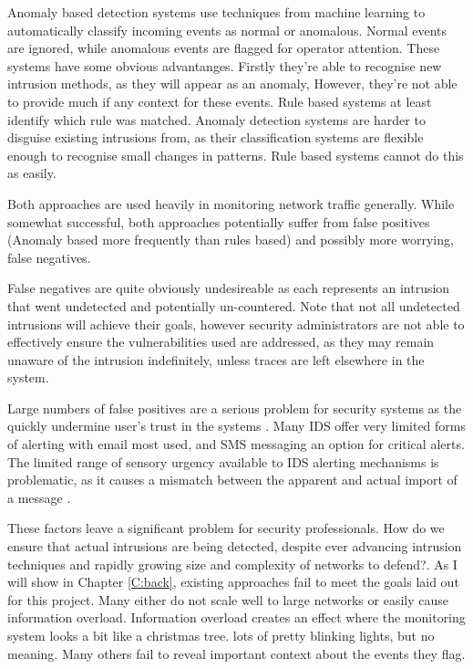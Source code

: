 Anomaly based detection systems use techniques from machine learning to automatically classify incoming events as normal or anomalous. Normal events are ignored, while anomalous events are flagged for operator attention. These systems have some obvious advantanges. Firstly they're able to recognise new intrusion methods, as they will appear as an anomaly, However, they're not able to provide much if any context for these events. Rule based systems at least identify which rule was matched. Anomaly detection systems are harder to disguise existing intrusions from, as their classification systems are flexible enough to recognise small changes in patterns. Rule based systems cannot do this as easily.

Both approaches are used heavily in monitoring network traffic generally. While somewhat successful, both approaches potentially suffer from false positives (Anomaly based more frequently than rules based) and possibly more worrying, false negatives. 

False negatives are quite obviously undesireable as each represents an intrusion that went undetected and potentially un-countered. Note that not all undetected intrusions will achieve their goals, however security administrators are not able to effectively ensure the vulnerabilities used are addressed, as they may remain unaware of the intrusion indefinitely, unless traces are left elsewhere in the system.

Large numbers of false positives are a serious problem for security systems as the quickly undermine user's trust in the systems \cite{stanton1994human}. Many IDS offer very limited forms of alerting with email most used, and SMS messaging an option for critical alerts. The limited range of sensory urgency available to IDS alerting mechanisms is problematic, as it causes a mismatch between the apparent and actual import of a message \cite{stanton1994human}. 

These factors leave a significant problem for security professionals. How do we ensure that actual intrusions are being detected, despite ever advancing intrusion techniques and rapidly growing size and complexity of networks to defend?. As I will show in Chapter \ref{C:back}, existing approaches fail to meet the goals laid out for this project. Many either do not scale well to large networks or easily cause information overload. Information overload creates an effect where the monitoring system looks a bit like a christmas tree. lots of pretty blinking lights, but no meaning. Many others fail to reveal important context about the events they flag. 

